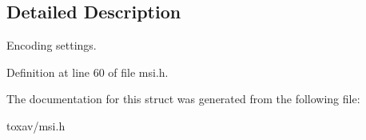 \subsection{Detailed Description}
Encoding settings. 

Definition at line 60 of file msi.\+h.



The documentation for this struct was generated from the following file\+:\begin{DoxyCompactItemize}
\item 
toxav/msi.\+h\end{DoxyCompactItemize}
